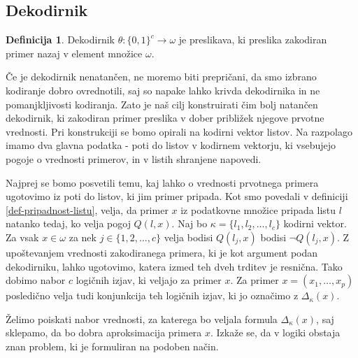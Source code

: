 \documentclass[12pt,a4paper,twoside]{article}
\theoremstyle{definition} %
\newtheorem{definicija}{Definicija}[section]
\theoremstyle{plain} %
\numberwithin{equation}{section}  %
\begin{document}

\subsection{Dekodirnik}
\label{pogl:dekodirnik}

\begin{definicija}
	\label{def-dekodiranje}
	Dekodirnik $\theta: \{0,1\}^c \rightarrow \omega$ je preslikava, ki preslika zakodiran primer nazaj v element množice $\omega$.
\end{definicija}
Če je dekodirnik nenatančen, ne moremo biti prepričani, da smo izbrano kodiranje dobro ovrednotili, saj so napake lahko krivda dekodirnika in ne pomanjkljivosti kodiranja.
Zato je naš cilj konstruirati čim bolj natančen dekodirnik, ki zakodiran primer preslika v dober približek njegove prvotne vrednosti.
Pri konstrukciji se bomo opirali na kodirni vektor listov.
Na razpolago imamo dva glavna podatka - poti do listov v kodirnem vektorju, ki vsebujejo pogoje o vrednosti primerov, in v listih shranjene napovedi. 

Najprej se bomo posvetili temu, kaj lahko o vrednosti prvotnega primera ugotovimo iz poti do listov, ki jim primer pripada.
Kot smo povedali v definiciji \ref{def-pripadnost-listu}, velja, da primer $x$ iz podatkovne množice pripada listu $l$ natanko tedaj, ko velja pogoj $Q(l,x)$.
Naj bo $\kappa=\{l_1, l_2, \ldots, l_c\}$ kodirni vektor.
Za vsak $x \in \omega$ za nek $j \in \{1,2,\ldots,c\}$ velja bodisi $Q(l_j,x)$ bodisi $\lnot Q(l_j,x)$.
Z upoštevanjem vrednosti zakodiranega primera, ki je kot argument podan dekodirniku, lahko ugotovimo, katera izmed teh dveh trditev je resnična.
Tako dobimo nabor $c$ logičnih izjav, ki veljajo za primer $x$.
Za primer $x=(x_1,\ldots,x_p)$ posledično velja tudi konjunkcija teh logičnih izjav, ki jo označimo z $\Delta_{\kappa}(x)$.

Želimo poiskati nabor vrednosti, za katerega bo veljala formula $\Delta_{\kappa}(x)$, saj sklepamo, da bo dobra aproksimacija primera $x$.
Izkaže se, da v logiki obstaja znan problem, ki je formuliran na podoben način.
\end{document}
